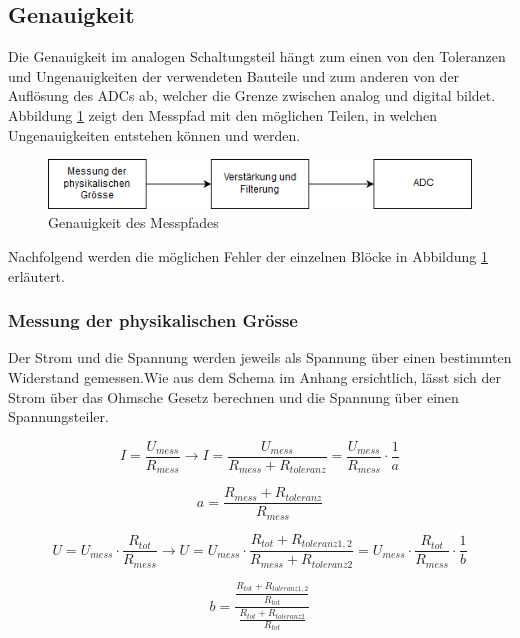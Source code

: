 \subsection{Genauigkeit}%
Die Genauigkeit im analogen Schaltungsteil hängt zum einen von den Toleranzen und Ungenauigkeiten der verwendeten Bauteile und zum anderen von der Auflösung des ADCs ab, welcher die Grenze zwischen analog und digital bildet. Abbildung \ref{fig:genauigkeit} zeigt den Messpfad mit den möglichen Teilen, in welchen Ungenauigkeiten entstehen können und werden.

\begin{figure}[htb]
	\includegraphics[width=160mm]{images/Analoge_Schaltung_genauigkeit.png}
	\caption{Genauigkeit des Messpfades} %
	\label{fig:genauigkeit}
\end{figure}

Nachfolgend werden die möglichen Fehler der einzelnen Blöcke in Abbildung \ref{fig:genauigkeit} erläutert.

\subsubsection*{Messung der physikalischen Grösse}
Der Strom und die Spannung werden jeweils als Spannung über einen bestimmten Widerstand gemessen.Wie aus dem Schema im Anhang ersichtlich, lässt sich der Strom über das Ohmsche Gesetz berechnen und die Spannung über einen Spannungsteiler. 

\begin{equation}
I = \frac{U_{mess}}{R_{mess}} \to I = \frac{U_{mess}}{R_{mess} + R_{toleranz}} = \frac{U_{mess}}{R_{mess}} \cdot \frac{1}{a}
\end{equation}

\[a = \frac{R_{mess} + R_{toleranz}}{R_{mess}}\]

\begin{equation}
U = U_{mess} \cdot \frac{R_{tot}}{R_{mess}} \to U = U_{mess} \cdot \frac{R_{tot} + R_{toleranz1,2}}{R_{mess}+R_{toleranz2}} = U_{mess} \cdot \frac{R_{tot}}{R_{mess}} \cdot \frac{1}{b}
\end{equation}

\[b = \frac{\frac{R_{tot} + R_{toleranz1,2}}{R_{tot}}}{\frac{R_{tot} + R_{toleranz2}}{R_{tot}}}\]

